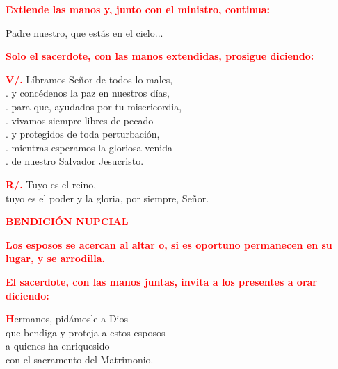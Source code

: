 \documentclass[12pt, letterpaper, spanish]{report}
\begin{document}
\large{\bfseries \textcolor{red}{Extiende las manos y, junto con el ministro, continua:}}\newline

\Large Padre nuestro, que est\'as en el cielo...\newline

\large{\bfseries \textcolor{red}{Solo el sacerdote, con las manos extendidas, prosigue diciendo:}}\newline

\Large \hspace{-0.9cm} {\bfseries \textcolor{red}{V/.}} \hspace{0.5cm} L\'ibramos Se\~nor de todos lo males,\\
.\hspace{1.5cm} y conc\'edenos la paz en nuestros d\'ias,\\
.\hspace{1.5cm} para que, ayudados por tu misericordia,\\
.\hspace{1.5cm} vivamos siempre libres de pecado\\
.\hspace{1.5cm} y protegidos de toda perturbaci\'on,\\
.\hspace{1.5cm} mientras esperamos la gloriosa venida\\
.\hspace{1.5cm} de nuestro Salvador Jesucristo.\newline

\Large \hspace{-0.9cm} {\bfseries \textcolor{red}{R/.}} \hspace{0.5cm} Tuyo es el reino,\\
tuyo es el poder y la gloria, por siempre, Se\~nor.\newline

\newpage

\Large {\bfseries \textcolor{red}{BENDICI\'ON NUPCIAL}} \newline

\large{\bfseries \textcolor{red}{Los esposos se acercan al altar o,
si es oportuno permanecen en su lugar, y se arrodilla.}}\newline

\large{\bfseries \textcolor{red}{El sacerdote, con las manos juntas, invita a los presentes a orar diciendo:}}\newline

\Large \lettrine{\bfseries \textcolor{red}{H}}{}ermanos, pid\'amosle a Dios\\
que bendiga y proteja a estos esposos\\
a quienes ha enriquesido\\
con el sacramento del Matrimonio.\newline
\end{document}
